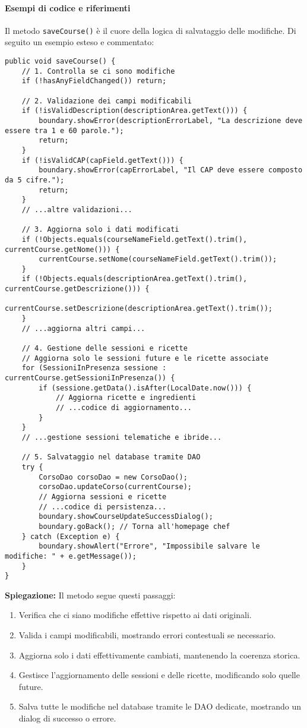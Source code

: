 \paragraph{Esempi di codice e riferimenti}

Il metodo \texttt{saveCourse()} è il cuore della logica di salvataggio delle modifiche. Di seguito un esempio esteso e commentato:
\begin{verbatim}
public void saveCourse() {
    // 1. Controlla se ci sono modifiche
    if (!hasAnyFieldChanged()) return;

    // 2. Validazione dei campi modificabili
    if (!isValidDescription(descriptionArea.getText())) {
        boundary.showError(descriptionErrorLabel, "La descrizione deve essere tra 1 e 60 parole.");
        return;
    }
    if (!isValidCAP(capField.getText())) {
        boundary.showError(capErrorLabel, "Il CAP deve essere composto da 5 cifre.");
        return;
    }
    // ...altre validazioni...

    // 3. Aggiorna solo i dati modificati
    if (!Objects.equals(courseNameField.getText().trim(), currentCourse.getNome())) {
        currentCourse.setNome(courseNameField.getText().trim());
    }
    if (!Objects.equals(descriptionArea.getText().trim(), currentCourse.getDescrizione())) {
        currentCourse.setDescrizione(descriptionArea.getText().trim());
    }
    // ...aggiorna altri campi...

    // 4. Gestione delle sessioni e ricette
    // Aggiorna solo le sessioni future e le ricette associate
    for (SessioniInPresenza sessione : currentCourse.getSessioniInPresenza()) {
        if (sessione.getData().isAfter(LocalDate.now())) {
            // Aggiorna ricette e ingredienti
            // ...codice di aggiornamento...
        }
    }
    // ...gestione sessioni telematiche e ibride...

    // 5. Salvataggio nel database tramite DAO
    try {
        CorsoDao corsoDao = new CorsoDao();
        corsoDao.updateCorso(currentCourse);
        // Aggiorna sessioni e ricette
        // ...codice di persistenza...
        boundary.showCourseUpdateSuccessDialog();
        boundary.goBack(); // Torna all'homepage chef
    } catch (Exception e) {
        boundary.showAlert("Errore", "Impossibile salvare le modifiche: " + e.getMessage());
    }
}
\end{verbatim}
\textbf{Spiegazione:} Il metodo segue questi passaggi:
\begin{enumerate}
    \item Verifica che ci siano modifiche effettive rispetto ai dati originali.
    \item Valida i campi modificabili, mostrando errori contestuali se necessario.
    \item Aggiorna solo i dati effettivamente cambiati, mantenendo la coerenza storica.
    \item Gestisce l'aggiornamento delle sessioni e delle ricette, modificando solo quelle future.
    \item Salva tutte le modifiche nel database tramite le DAO dedicate, mostrando un dialog di successo o errore.
\end{enumerate}
